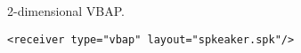 2-dimensional VBAP.

\begin{lstlisting}[numbers=none]
<receiver type="vbap" layout="spkeaker.spk"/>
\end{lstlisting}

